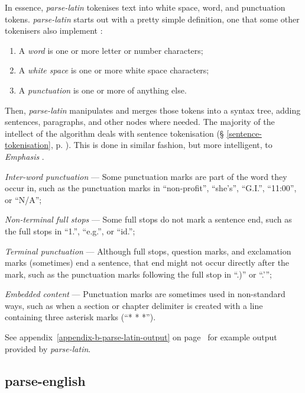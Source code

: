 In essence, \emph{parse-latin} tokenises text into white space, word, and
  punctuation tokens.
\emph{parse-latin} starts out with a pretty simple definition, one that
  some other tokenisers also implement \autocite{treebank-tokenisation}:

\begin{enumerate}
\item A \emph{word} is one or more letter or number characters;
\item A \emph{white space} is one or more white space characters;
\item A \emph{punctuation} is one or more of anything else.
\end{enumerate}

\noindent Then, \emph{parse-latin} manipulates and merges those tokens into a
  syntax tree, adding sentences, paragraphs, and other nodes where needed.
The majority of the intellect of the algorithm deals with sentence
  tokenisation (§ \ref{sentence-tokenisation}, p.
  \pageref{sentence-tokenisation}).
This is done in similar fashion, but more intelligent, to \emph{Emphasis}
  \autocite{nytimes/emphasis-source-code}.

\begin{aenumerate}
\item\emph{Inter-word punctuation} --- Some punctuation marks are part of
  the word they occur in, such as the punctuation marks in ``non-profit'',
  ``she's'', ``G.I.'', ``11:00'', or ``N\slash A'';
\item\emph{Non-terminal full stops} --- Some full stops do not mark a
  sentence end, such as the full stops in ``1.'', ``e.g.'', or ``id.'';
\item\emph{Terminal punctuation} --- Although full stops, question marks,
  and exclamation marks (sometimes) end a sentence, that end might not occur
  directly after the mark, such as the punctuation marks following the
  full stop in ``.)'' or ``.'{}'';
\item\emph{Embedded content} --- Punctuation marks are sometimes used in
  non-standard ways, such as when a section or chapter delimiter is
  created with a line containing three asterisk marks (``* * *'').
\end{aenumerate}

\noindent See appendix~\ref{appendix-b-parse-latin-output} on
page~\pageref{appendix-b-parse-latin-output} for example output provided
by \emph{parse-latin}.

\subsection{parse-english}\label{parse-english}


